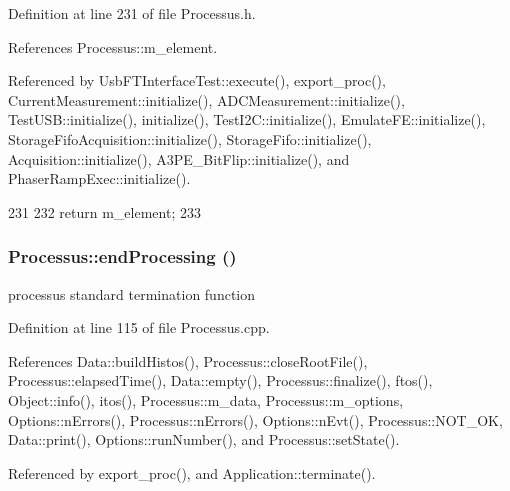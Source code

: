 Definition at line 231 of file Processus.h.

References Processus::m\_\-element.

Referenced by UsbFTInterfaceTest::execute(), export\_\-proc(), CurrentMeasurement::initialize(), ADCMeasurement::initialize(), TestUSB::initialize(), initialize(), TestI2C::initialize(), EmulateFE::initialize(), StorageFifoAcquisition::initialize(), StorageFifo::initialize(), Acquisition::initialize(), A3PE\_\-BitFlip::initialize(), and PhaserRampExec::initialize().


\begin{DoxyCode}
231                       {
232     return m_element;
233   }
\end{DoxyCode}
\hypertarget{classProcessus_a5e4da662989d356b89d490b89c7afbfd}{
\subsubsection[{endProcessing}]{ Processus::endProcessing ()}}
\label{classProcessus_a5e4da662989d356b89d490b89c7afbfd}
processus standard termination function 

Definition at line 115 of file Processus.cpp.

References Data::buildHistos(), Processus::closeRootFile(), Processus::elapsedTime(), Data::empty(), Processus::finalize(), ftos(), Object::info(), itos(), Processus::m\_\-data, Processus::m\_\-options, Options::nErrors(), Processus::nErrors(), Options::nEvt(), Processus::NOT\_\-OK, Data::print(), Options::runNumber(), and Processus::setState().

Referenced by export\_\-proc(), and Application::terminate().


